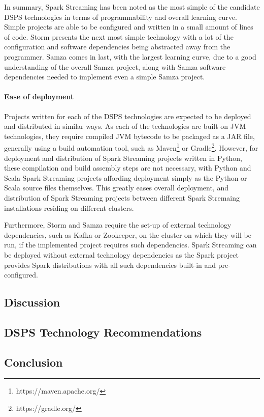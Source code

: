 In summary, Spark Streaming has been noted as the most simple of the candidate DSPS technologies in terms of programmability
and overall learning curve. Simple projects are able to be configured and written in a small amount of lines of code.
Storm presents the next most simple technology with a lot of the configuration and software dependencies being abstracted
away from the programmer. Samza comes in last, with the largest learning curve, due to a good understanding of the overall
Samza project, along with Samza software dependencies needed to implement even a simple Samza project.


\paragraph{Ease of deployment}

Projects written for each of the DSPS technologies are expected to be deployed and distributed in similar ways. As each
of the technologies are built on JVM technologies, they require compiled JVM bytecode to be packaged as a JAR file, generally
using a build automation tool, such as Maven\footnote{https://maven.apache.org/} or Gradle\footnote{https://gradle.org/}.
However, for deployment and distribution of Spark Streaming projects written in Python, these compilation and build
assembly steps are not necessary, with Python and Scala Spark Streaming projects affording deployment simply as the Python
or Scala source files themselves. This greatly eases overall deployment, and distribution of Spark Streaming projects between
different Spark Stremaing installations residing on different clusters.

Furthermore, Storm and Samza require the set-up of external technology dependencies, such as Kafka or Zookeeper, on the
cluster on which they will be run, if the implemented project requires such dependencies. Spark Streaming can be deployed
without external technology dependencies as the Spark project provides Spark distributions with all such dependencies built-in
and pre-configured.




\subsection{Discussion} %
\label{sub:eval_discussion}



\subsection{DSPS Technology Recommendations} %
\label{sub:dsps_technology_recommendations}



\subsection{Conclusion} %
\label{sub:evaluation_conclusion}

